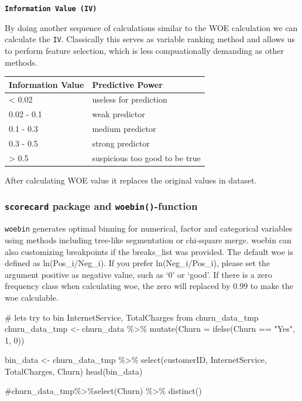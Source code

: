 \documentclass[
  letterpaper,
  DIV=11,
  numbers=noendperiod]{scrreprt}
\newenvironment{Shaded}{\begin{snugshade}}{\end{snugshade}}
\newcommand{\AttributeTok}[1]{\textcolor[rgb]{0.40,0.45,0.13}{#1}}
\newcommand{\CommentTok}[1]{\textcolor[rgb]{0.37,0.37,0.37}{#1}}
\newcommand{\DecValTok}[1]{\textcolor[rgb]{0.68,0.00,0.00}{#1}}
\newcommand{\FunctionTok}[1]{\textcolor[rgb]{0.28,0.35,0.67}{#1}}
\newcommand{\NormalTok}[1]{\textcolor[rgb]{0.00,0.23,0.31}{#1}}
\newcommand{\OtherTok}[1]{\textcolor[rgb]{0.00,0.23,0.31}{#1}}
\newcommand{\SpecialCharTok}[1]{\textcolor[rgb]{0.37,0.37,0.37}{#1}}
\newcommand{\StringTok}[1]{\textcolor[rgb]{0.13,0.47,0.30}{#1}}
\begin{document}
\textbf{\texttt{Information\ Value\ (IV)}}

By doing another sequence of calculations similar to the WOE calculation
we can calculate the \texttt{IV}. Classically this serves as variable
ranking method and allows us to perform feature selection, which is less
compuationally demanding as other methods.

\begin{longtable}[]{@{}ll@{}}
\toprule\noalign{}
Information Value & Predictive Power \\
\midrule\noalign{}
\endhead
\bottomrule\noalign{}
\endlastfoot
\textless{} 0.02 & useless for prediction \\
0.02 - 0.1 & weak predictor \\
0.1 - 0.3 & medium predictor \\
0.3 - 0.5 & strong predictor \\
\textgreater{} 0.5 & suspicious too good to be true \\
\end{longtable}

After calculating WOE value it replaces the original values in dataset.

\subsubsection{\texorpdfstring{\texttt{scorecard} package and
\texttt{woebin()}-function}{scorecard package and woebin()-function}}\label{scorecard-package-and-woebin-function}

\texttt{woebin} generates optimal binning for numerical, factor and
categorical variables using methods including tree-like segmentation or
chi-square merge. woebin can also customizing breakpoints if the
breaks\_list was provided. The default woe is defined as
ln(Pos\_i/Neg\_i). If you prefer ln(Neg\_i/Pos\_i), please set the
argument positive as negative value, such as `0' or `good'. If there is
a zero frequency class when calculating woe, the zero will replaced by
0.99 to make the woe calculable.

\begin{Shaded}
\begin{Highlighting}[]
\CommentTok{\# lets try to bin InternetService, TotalCharges from churn\_data\_tmp}
\NormalTok{churn\_data\_tmp }\OtherTok{\textless{}{-}}\NormalTok{ churn\_data }\SpecialCharTok{\%\textgreater{}\%}
        \FunctionTok{mutate}\NormalTok{(}\AttributeTok{Churn =} \FunctionTok{ifelse}\NormalTok{(Churn }\SpecialCharTok{==} \StringTok{"Yes"}\NormalTok{, }\DecValTok{1}\NormalTok{, }\DecValTok{0}\NormalTok{))}

\NormalTok{bin\_data }\OtherTok{\textless{}{-}}\NormalTok{ churn\_data\_tmp }\SpecialCharTok{\%\textgreater{}\%} \FunctionTok{select}\NormalTok{(customerID, InternetService, TotalCharges, Churn)}
\FunctionTok{head}\NormalTok{(bin\_data)}

\CommentTok{\#churn\_data\_tmp\%\textgreater{}\%select(Churn) \%\textgreater{}\% distinct()}
\end{Highlighting}
\end{Shaded}
\end{document}
